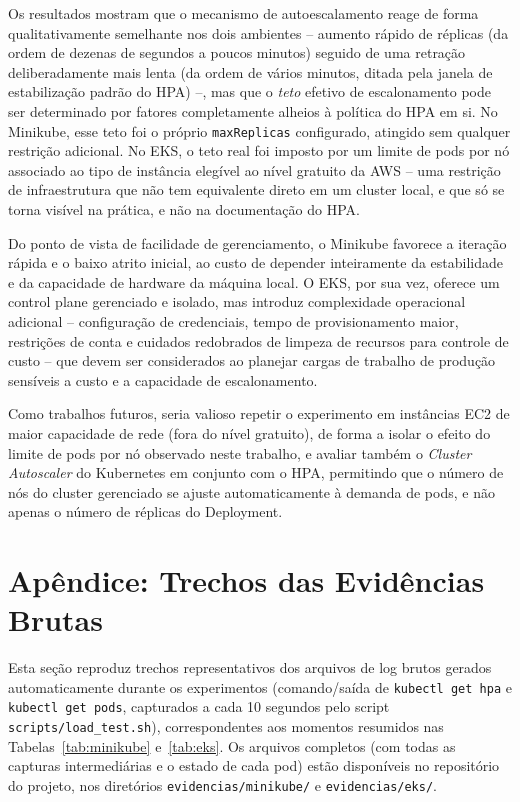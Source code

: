 \documentclass[12pt]{article}
\begin{document}
Os resultados mostram que o mecanismo de autoescalamento reage de forma
qualitativamente semelhante nos dois ambientes -- aumento rápido de
réplicas (da ordem de dezenas de segundos a poucos minutos) seguido de uma
retração deliberadamente mais lenta (da ordem de vários minutos, ditada pela
janela de estabilização padrão do HPA) --, mas que o \emph{teto} efetivo de
escalonamento pode ser determinado por fatores completamente alheios à
política do HPA em si. No Minikube, esse teto foi o próprio
\texttt{maxReplicas} configurado, atingido sem qualquer restrição adicional.
No EKS, o teto real foi imposto por um limite de pods por nó associado ao
tipo de instância elegível ao nível gratuito da AWS -- uma restrição de
infraestrutura que não tem equivalente direto em um cluster local, e que só
se torna visível na prática, e não na documentação do HPA.

Do ponto de vista de facilidade de gerenciamento, o Minikube favorece a
iteração rápida e o baixo atrito inicial, ao custo de depender inteiramente
da estabilidade e da capacidade de hardware da máquina local. O EKS, por
sua vez, oferece um control plane gerenciado e isolado, mas introduz
complexidade operacional adicional -- configuração de credenciais, tempo de
provisionamento maior, restrições de conta e cuidados redobrados de
limpeza de recursos para controle de custo -- que devem ser considerados ao
planejar cargas de trabalho de produção sensíveis a custo e a capacidade de
escalonamento.

Como trabalhos futuros, seria valioso repetir o experimento em instâncias
EC2 de maior capacidade de rede (fora do nível gratuito), de forma a
isolar o efeito do limite de pods por nó observado neste trabalho, e
avaliar também o \emph{Cluster Autoscaler} do Kubernetes em conjunto com o
HPA, permitindo que o número de nós do cluster gerenciado se ajuste
automaticamente à demanda de pods, e não apenas o número de réplicas do
Deployment.




\appendix

\section{Apêndice: Trechos das Evidências Brutas}

Esta seção reproduz trechos representativos dos arquivos de log brutos
gerados automaticamente durante os experimentos (comando/saída de
\texttt{kubectl get hpa} e \texttt{kubectl get pods}, capturados a cada 10
segundos pelo script \texttt{scripts/load\_test.sh}), correspondentes aos
momentos resumidos nas Tabelas~\ref{tab:minikube} e~\ref{tab:eks}. Os
arquivos completos (com todas as capturas intermediárias e o estado de cada
pod) estão disponíveis no repositório do projeto, nos diretórios
\texttt{evidencias/minikube/} e \texttt{evidencias/eks/}.
\end{document}

